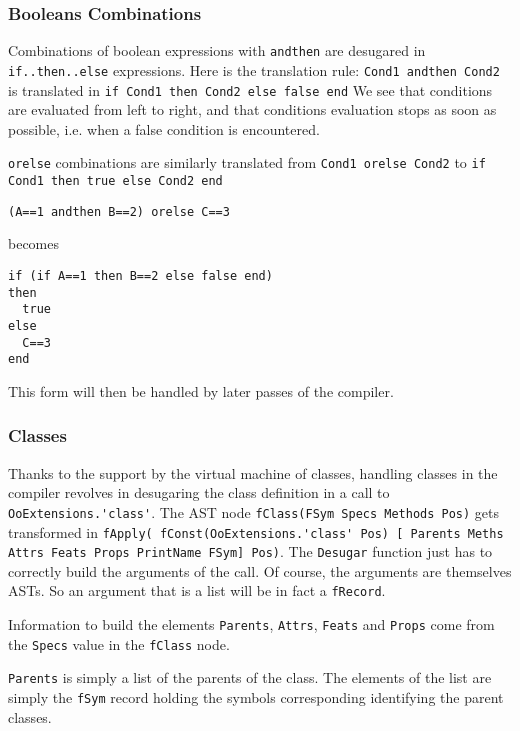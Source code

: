 \documentclass[a4paper]{memoir}
\begin{document}
\subsubsection{Booleans Combinations}
Combinations of boolean expressions with \lstinline!andthen! are desugared in
\lstinline!if..then..else! expressions. Here is the translation
rule:
\lstinline!Cond1 andthen Cond2! is translated in \lstinline!if Cond1 then Cond2 else false end! 
We see that conditions are evaluated from left to right, and that conditions
evaluation stops as soon as possible, i.e. when a false condition is
encountered.

\lstinline!orelse! combinations are similarly translated from \lstinline!Cond1 orelse Cond2! to \lstinline!if Cond1 then true else Cond2 end!  
\begin{lstlisting}
(A==1 andthen B==2) orelse C==3
\end{lstlisting}
becomes

\begin{lstlisting}
if (if A==1 then B==2 else false end)
then
  true
else
  C==3
end
\end{lstlisting}

This form will then be handled by later passes of the compiler.
\subsubsection{Classes}\label{sec:arch:desugar:classes}
Thanks to the support by the virtual machine of classes, handling classes in the
compiler revolves in desugaring the class definition in a call to
\lstinline!OoExtensions.'class'!. 
The AST node \lstinline!fClass(FSym Specs Methods Pos)! gets transformed in 
\lstinline!fApply( fConst(OoExtensions.'class' Pos) [ Parents Meths Attrs Feats Props PrintName FSym] Pos)!.
The \lstinline!Desugar! function just has to correctly build the arguments of
the call. Of course, the arguments are themselves ASTs. So an argument that is a
list will be in fact a \lstinline!fRecord!.

Information to build the elements \lstinline!Parents!, \lstinline!Attrs!,
\lstinline!Feats! and \lstinline!Props! come from the \lstinline!Specs! value in
the \lstinline!fClass! node.

\lstinline!Parents! is simply a list of the parents of the class. The elements
of the list are simply the \lstinline!fSym! record holding the symbols
corresponding identifying the parent classes.
\end{document}
